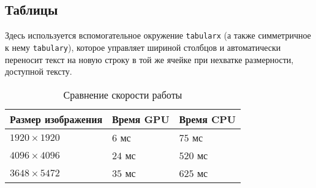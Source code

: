\subsection{Таблицы}
Здесь используется вспомогательное окружение \texttt{tabularx} (а также симметричное к нему \texttt{tabulary}), которое управляет шириной столбцов и автоматически переносит текст на новую строку в той же ячейке при нехватке размерности, доступной тексту.

\begin{table}[H]
    \centering
    \begin{tabularx}{\textwidth}{| X | X | X |}
    	\hline
    	\textbf{Размер изображения} & \textbf{Время GPU} & \textbf{Время CPU} \\ \hline
    	$1920\times 1920$           & $6$ мс             & $75$ мс            \\ \hline
    	$4096\times 4096$           & $24$ мс            & $520$ мс           \\ \hline
    	$3648\times 5472$           & $35$ мс            & $625$ мс           \\ \hline
    \end{tabularx}
    \caption{Сравнение скорости работы}
\end{table}

